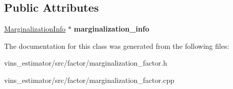\subsection*{Public Attributes}
\begin{DoxyCompactItemize}
\item 
\mbox{\label{classMarginalizationFactor_aa07b26d99c25c70a1ff47fa5f13b73cd}} 
\hyperlink{classMarginalizationInfo}{Marginalization\+Info} $\ast$ {\bfseries marginalization\+\_\+info}
\end{DoxyCompactItemize}


The documentation for this class was generated from the following files\+:\begin{DoxyCompactItemize}
\item 
vins\+\_\+estimator/src/factor/marginalization\+\_\+factor.\+h\item 
vins\+\_\+estimator/src/factor/marginalization\+\_\+factor.\+cpp\end{DoxyCompactItemize}
